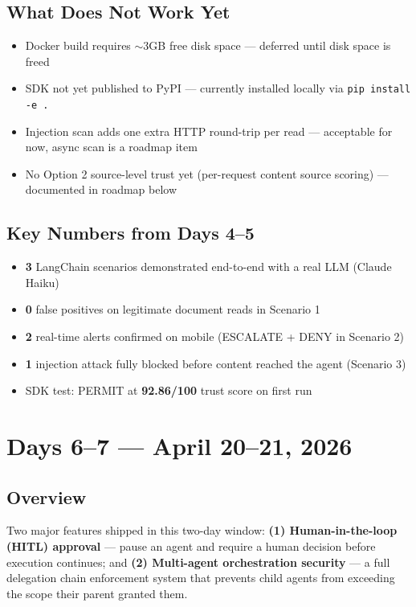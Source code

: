 \documentclass[12pt, a4paper]{article}
\begin{document}
\subsection{What Does Not Work Yet}

\begin{itemize}[noitemsep]
  \item Docker build requires $\sim$3GB free disk space — deferred until disk space is freed
  \item SDK not yet published to PyPI — currently installed locally via \texttt{pip install -e .}
  \item Injection scan adds one extra HTTP round-trip per read — acceptable for now, async scan is a roadmap item
  \item No Option 2 source-level trust yet (per-request content source scoring) — documented in roadmap below
\end{itemize}

\subsection{Key Numbers from Days 4--5}

\begin{itemize}[noitemsep]
  \item \textbf{3} LangChain scenarios demonstrated end-to-end with a real LLM (Claude Haiku)
  \item \textbf{0} false positives on legitimate document reads in Scenario 1
  \item \textbf{2} real-time alerts confirmed on mobile (ESCALATE + DENY in Scenario 2)
  \item \textbf{1} injection attack fully blocked before content reached the agent (Scenario 3)
  \item SDK test: PERMIT at \textbf{92.86/100} trust score on first run
\end{itemize}

\section{Days 6--7 — April 20--21, 2026}

\subsection{Overview}

Two major features shipped in this two-day window:
\textbf{(1) Human-in-the-loop (HITL) approval} — pause an agent and require a
human decision before execution continues; and
\textbf{(2) Multi-agent orchestration security} — a full delegation chain
enforcement system that prevents child agents from exceeding the scope their
parent granted them.
\end{document}
